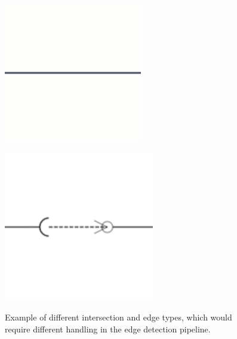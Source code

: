 \begin{figure}[htb]
\begin{minipage}{0.15\textwidth}
        \label{fig:intersection3}
    \end{minipage}
    \hfill
    \begin{minipage}{0.15\textwidth}
        \centering
        \includegraphics[width=\textwidth]{pictures/intersection4.png}
        \label{fig:intersection4}
    \end{minipage}
    \hfill
    \begin{minipage}{0.15\textwidth}
        \centering
        \includegraphics[width=\textwidth]{pictures/intersection5.png}
        \label{fig:intersection5}
    \end{minipage}
    \caption[Example of intersection and edge types]{Example of different intersection and edge types, which would require different handling in the edge detection pipeline.}
    \label{fig:intersections}
\end{figure}
